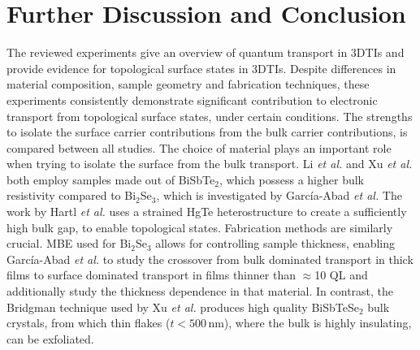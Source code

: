 \documentclass[twocolumn,10pt,a4paper]{article}
\begin{document}
\section{Further Discussion and Conclusion}
The reviewed experiments give an overview of quantum transport in 3DTIs and provide evidence for topological surface states in 3DTIs. Despite differences in material composition, sample geometry and fabrication techniques, these experiments consistently demonstrate significant contribution to electronic transport from topological surface states, under certain conditions. The strengths to isolate the surface carrier contributions from the bulk carrier contributions, is compared between all studies. 
The choice of material plays an important role when trying to isolate the surface from the bulk transport. Li \textit{et al.} and Xu \textit{et al.} both employ samples made out of BiSbTe$_2$, which possess a higher bulk resistivity compared to Bi$_2$Se$_3$, which is investigated by García-Abad \textit{et al.} The work by Hartl \textit{et al.} uses a strained HgTe heterostructure to create a sufficiently high bulk gap, to enable topological states. Fabrication methods are similarly crucial. MBE used for Bi$_2$Se$_3$ allows for controlling sample thickness, enabling García-Abad \textit{et al.} to study the crossover from bulk dominated transport in thick films to surface dominated transport in films thinner than $\approx$10 QL and additionally study the thickness dependence in that material. In contrast, the Bridgman technique used by Xu \textit{et al.} produces high quality BiSbTeSe$_2$ bulk crystals, from which thin flakes ($t<500\,$nm), where the bulk is highly insulating, can be exfoliated.
\end{document}
